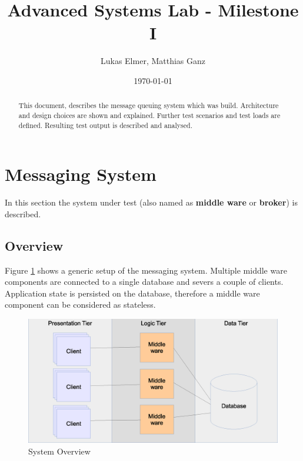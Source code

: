 \documentclass[a4paper]{article}
\title{Advanced Systems Lab - Milestone I}
\author{Lukas Elmer, Matthias Ganz}
\date{\today}
\begin{document}
\maketitle


\begin{abstract}

This document, describes the message queuing system which was build. Architecture and design choices are shown and explained. Further test scenarios and test loads are defined. Resulting test output is described and analysed.

\end{abstract}

\section{Messaging System}
In this section the system under test (also named as \textbf{middle ware}  or \textbf{broker}) is described.


\subsection{Overview}

Figure \ref{fig:system-overview} shows a generic setup of the messaging system. Multiple middle ware components are connected to a single database and severs a couple of clients. Application state is persisted on the database, therefore a middle ware component can be considered as stateless.


\begin{figure}
  \begin{center}
    \includegraphics[scale=0.4]{../drawings/system-overview.eps}
  \end{center}
  \caption{System Overview}
  \label{fig:system-overview}
\end{figure}
\end{document}
